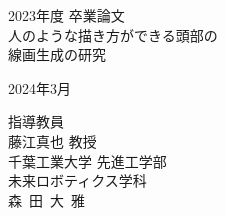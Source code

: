 \documentclass[12pt,titlepage,a4j,oneside]{myjbook2}
\begin{document}
  \begin{titlepage}
    \begin{center}
      \vspace*{1cm}
      \LARGE 2023年度 卒業論文 \\
      \vspace*{1cm}
      \Huge 人のような描き方ができる頭部の \\
      線画生成の研究 \\
      \vspace*{45mm}

      {\LARGE %
      2024年3月}
      \vspace*{10mm}
      
      {\Large
      指導教員 \\
      藤江真也 教授} \\
      \vspace*{20mm}
      \LARGE
      千葉工業大学 先進工学部 \\
      未来ロボティクス学科 \\
      \vspace*{10mm}
      {\Huge 森~田~大~雅}
    \end{center}
  \end{titlepage}

  \frontmatter
  \baselineskip=21pt
  \tableofcontents
  \listoffigures
  \listoftables

  \setlength{\abovedisplayskip}{25pt plus0pt minus0pt}
  \setlength{\belowdisplayskip}{25pt plus0pt minus0pt}

  \mainmatter
  

  

  

  

  

  
  
  

  \backmatter
  

  

  \mainmatter
  \addtocounter{page}{2}
  \appendix
  
\end{document}
